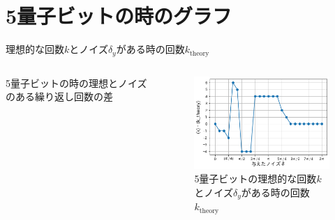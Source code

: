 \documentclass[platex,dvipdfmx]{beamer}			%
\begin{document}
\section{5量子ビットの時のグラフ}
\begin{frame}{理想的な回数$k$とノイズ$\delta_y$がある時の回数$k_{\text{theory}}$}
    \begin{columns}[onlytextwidth]
        \begin{column}{.45\textwidth}
            5量子ビットの時の理想とノイズのある繰り返し回数の差
        \end{column}
        \hfill
        \begin{column}{.60\textwidth}
        \begin{figure}
          \includegraphics[width=\textwidth]{figures/5qubits/5Qubitk_theory.png}
          \caption{5量子ビットの理想的な回数$k$とノイズ$\delta_y$がある時の回数$k_{\text{theory}}$}
        \end{figure}
        \end{column}
        \end{columns}
\end{frame}
\end{document}
